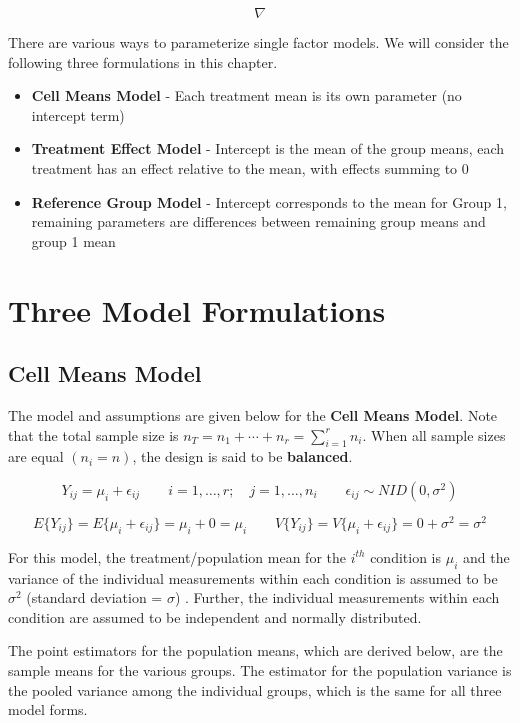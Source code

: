 \documentclass[
]{book}
\providecommand{\tightlist}{%
  \setlength{\itemsep}{0pt}\setlength{\parskip}{0pt}}
\begin{document}
\[\nabla\]

There are various ways to parameterize single factor models. We will
consider the following three formulations in this chapter.

\begin{itemize}
\tightlist
\item
  \textbf{Cell Means Model} - Each treatment mean is its own parameter
  (no intercept term)
\item
  \textbf{Treatment Effect Model} - Intercept is the mean of the group
  means, each treatment has an effect relative to the mean, with effects
  summing to 0
\item
  \textbf{Reference Group Model} - Intercept corresponds to the mean for
  Group 1, remaining parameters are differences between remaining group
  means and group 1 mean
\end{itemize}

\section{Three Model Formulations}\label{three-model-formulations}

\subsection{Cell Means Model}\label{cell-means-model}

The model and assumptions are given below for the \textbf{Cell Means
Model}. Note that the total sample size is
\(n_T=n_1+\cdots+n_r=\sum_{i=1}^rn_i\). When all sample sizes are equal
\((n_i=n)\), the design is said to be \textbf{balanced}.

\[ Y_{ij}=\mu_i + \epsilon_{ij} 
\qquad i=1,\ldots,r; \quad j=1,\ldots, n_i \qquad \epsilon_{ij} \sim NID\left(0,\sigma^2\right) \]

\[ E\{Y_{ij}\} = E\{\mu_i + \epsilon_{ij}\} = \mu_i+0=\mu_i \qquad
V\{Y_{ij}\} = V\{\mu_i + \epsilon_{ij}\} = 0 +\sigma^2=\sigma^2 \]

For this model, the treatment/population mean for the \(i^{th}\)
condition is \(\mu_i\) and the variance of the individual measurements
within each condition is assumed to be \(\sigma^2\) (standard deviation
= \(\sigma\)) . Further, the individual measurements within each
condition are assumed to be independent and normally distributed.

The point estimators for the population means, which are derived below,
are the sample means for the various groups. The estimator for the
population variance is the pooled variance among the individual groups,
which is the same for all three model forms.
\end{document}
